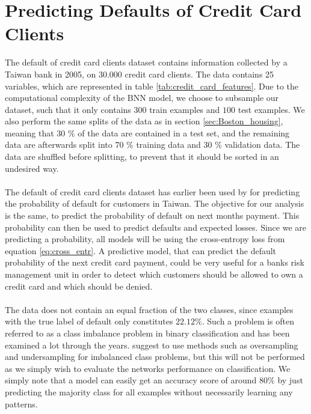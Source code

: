 \clearpage
\section{Predicting Defaults of Credit Card Clients} \label{sec:credit_default}
The default of credit card clients dataset contains information collected by a Taiwan bank in 2005, on $30.000$ credit card clients. The data contains 25 variables, which are represented in table \ref{tab:credit_card_features}. Due to the computational complexity of the BNN model, we choose to subsample our dataset, such that it only contains $300$ train examples and $100$ test examples. We also perform the same splits of the data as in section \ref{sec:Boston_housing}, meaning that 30 \% of the data are contained in a test set, and the remaining data are afterwards split into 70 \% training data and 30 \% validation data. The data are shuffled before splitting, to prevent that it should be sorted in an undesired way.
\\
\\
The default of credit card clients dataset has earlier been used by \cite{Yeh2009TheCO} for predicting the probability of default for customers in Taiwan. The objective for our analysis is the same, to predict the probability of default on next months payment. This probability can then be used to predict defaults and expected losses. Since we are predicting a probability, all models will be using the cross-entropy loss from equation \ref{eq:cross_entr}. A predictive model, that can predict the default probability of the next credit card payment, could be very useful for a banks risk management unit in order to detect which customers should be allowed to own a credit card and which should be denied. 
\\
\\
The data does not contain an equal fraction of the two classes, since examples with the true label of default only constitutes $22.12\%$. Such a problem is often referred to as a class imbalance problem in binary classification and has been examined a lot through the years. \cite{imbalane_danquah2020} suggest to use methods such as oversampling and undersampling for imbalanced class problems, but this will not be performed as we simply wish to evaluate the networks performance on classification. We simply note that a model can easily get an accuracy score of around $80\%$ by just predicting the majority class for all examples without necessarily learning any patterns. 




